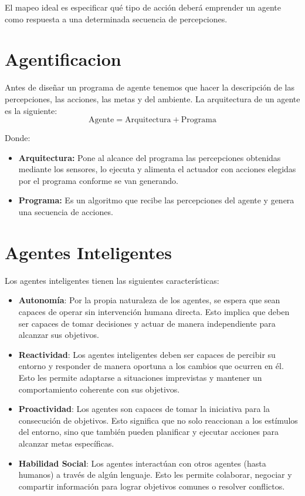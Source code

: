 \medskip
El mapeo ideal es especificar qué tipo de acción deberá emprender un agente como respuesta a una determinada secuencia de percepciones.


\section{Agentificacion}
Antes de diseñar un programa de agente tenemos que hacer la descripción de las percepciones, las acciones, las metas y del ambiente.
La arquitectura de un agente es la siguiente:
\begin{equation*}
    \text{Agente} = \text{Arquitectura} + \text{Programa}
\end{equation*}

Donde:
\begin{itemize}
    \item \textbf{Arquitectura:} Pone al alcance del programa las percepciones obtenidas mediante los sensores, lo ejecuta y alimenta el actuador con acciones elegidas por el programa conforme se van generando.
    \item \textbf{Programa:} Es un algoritmo que recibe las percepciones del agente y genera una secuencia de acciones.
\end{itemize}

\section{Agentes Inteligentes}
Los agentes inteligentes tienen las siguientes características:
\begin{itemize}
    \item \textbf{Autonomía}: Por la propia naturaleza de los agentes, se espera que sean capaces de operar sin intervención humana directa. Esto implica que deben ser capaces de tomar decisiones y actuar de manera independiente para alcanzar sus objetivos.
    \item \textbf{Reactividad}: Los agentes inteligentes deben ser capaces de percibir su entorno y responder de manera oportuna a los cambios que ocurren en él. Esto les permite adaptarse a situaciones imprevistas y mantener un comportamiento coherente con sus objetivos.
    \item \textbf{Proactividad}: Los agentes son capaces de tomar la iniciativa para la consecución de objetivos. Esto significa que no solo reaccionan a los estímulos del entorno, sino que también pueden planificar y ejecutar acciones para alcanzar metas específicas.
    \item \textbf{Habilidad Social}: Los agentes interactúan con otros agentes (hasta humanos) a través de algún lenguaje. Esto les permite colaborar, negociar y compartir información para lograr objetivos comunes o resolver conflictos.
\end{itemize}

